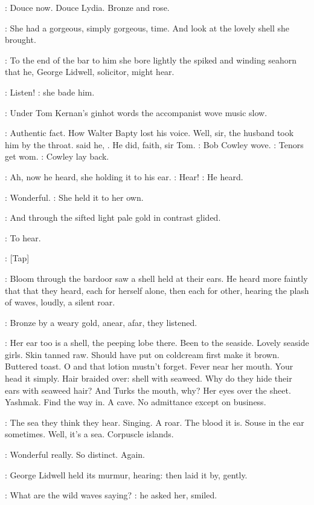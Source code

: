:
Douce now.
Douce Lydia.
Bronze and rose.

:
She had a gorgeous,
simply gorgeous,
time.
And look at the lovely
shell she brought.

:
To the end of the bar to him she bore lightly the spiked and winding
seahorn that he,
George Lidwell,
solicitor,
might hear.

\MissD:
Listen!
:
she bade him.

:
Under Tom Kernan's ginhot words the accompanist wove music slow.

\BloomInt:
Authentic fact.
How Walter Bapty lost his voice.
Well,
sir,
the husband took him by the throat.
said he,
.
He did,
faith,
sir Tom.
:
Bob Cowley wove.
\BloomInt:
Tenors get wom.
:
Cowley lay back.

:
Ah,
now he heard,
she holding it to his ear.
\MissD:
Hear!
:
He heard.

\lidwell:
Wonderful.
:
She held it to her own.

:
And through the sifted light pale gold
in contrast glided.

\BloomInt:
To hear.

\stripling:
[Tap]

:
Bloom through the bardoor saw a shell held at their ears.
He heard
more faintly that that they heard,
each for herself alone,
then each for
other,
hearing the plash of waves,
loudly,
a silent roar.

:
Bronze by a weary gold,
anear,
afar,
they listened.

\BloomInt:
Her ear too is a shell,
the peeping lobe there.
Been to the seaside.
Lovely seaside girls.
Skin tanned raw.
Should have put on coldcream first
make it brown.
Buttered toast.
O and that lotion mustn't forget.
Fever
near her mouth.
Your head it simply.
Hair braided over:
shell with
seaweed.
Why do they hide their ears with seaweed hair?
And Turks the
mouth,
why?
Her eyes over the sheet.
Yashmak.
Find the way in.
A cave.
No
admittance except on business.

\BloomInt:
The sea they think they hear.
Singing.
A roar.
The blood it is.
Souse
in the ear sometimes.
Well,
it's a sea.
Corpuscle islands.

\lidwell:
Wonderful really.
So distinct.
Again.

:
George Lidwell held its murmur,
hearing:
then laid it by,
gently.

\lidwell:
What are the wild waves saying?
:
he asked her,
smiled.

